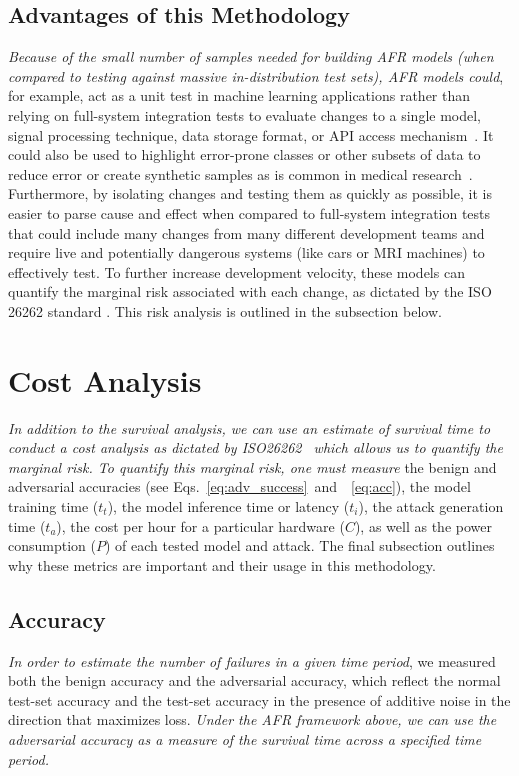 \documentclass[conference]{IEEEtran}
\newcommand{\cm}[1]{\textit{{\color{blue}#1}}}
\begin{document}
\subsection{Advantages of this Methodology}
\label{advantages}
\cm{Because of the small number of samples needed for building AFR models (when compared to testing against massive in-distribution test sets), AFR models could}, for example, act as a unit test in machine learning applications rather than relying on full-system integration tests to evaluate changes to a single model, signal processing technique, data storage format, or API access mechanism~\cite{schmoor2000sample,lachin1981introduction}. It could also be used to highlight error-prone classes or other subsets of data to reduce error or create synthetic samples as is common in medical research~\cite{kleinbaum1996survival}. Furthermore, by isolating changes and testing them as quickly as possible, it is  easier to parse cause and effect when compared to full-system integration tests that could include many changes from many different development teams and require live and potentially dangerous systems (like cars or MRI machines) to effectively test. To further increase development velocity, these models can quantify the marginal risk associated with each change, as dictated by the ISO 26262 standard \cite{iso26262}. This risk analysis is outlined in the subsection below.

\section{Cost Analysis}
\label{cost}
\cm{In addition to the survival analysis, we can use an estimate of survival time to conduct a cost analysis as dictated by ISO26262~\cite{iso26262} which allows us to quantify the marginal risk. To quantify this marginal risk, one must measure} the benign and adversarial accuracies (see Eqs.~\ref{eq:adv_success}~and~~\ref{eq:acc}), the model training time ($t_{t}$), the model inference time or latency ($t_{i}$), the attack generation time ($t_{a}$), the cost per hour for a particular hardware ($C$), as well as the power consumption ($P$) of each tested model and attack. The final subsection outlines why these metrics are important and their usage in this methodology.

\subsection{Accuracy}
\cm{In order to estimate the number of failures in a given time period}, we measured both the benign accuracy and the adversarial accuracy, which reflect the normal test-set accuracy and the test-set accuracy in the presence of additive noise in the direction that maximizes loss. \cm{Under the AFR framework above, we can use the adversarial accuracy as a measure of the survival time across a specified time period.}
\end{document}
